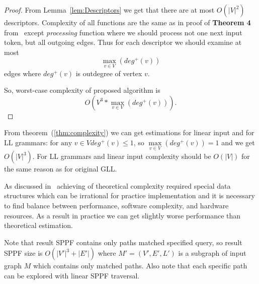 \begin{proof}

From Lemma~\ref{lem:Descriptors} we get that there are at most $O(|V|^2)$ descriptors. 
Complexity of all functions are the same as in proof of \textbf{Theorem 4} from~\cite{gllParsingTree} except \textit{processing} function where we should process not one next input token, but all outgoing edges.
Thus for each descriptor we should examine at most $$\max\limits_{v \in V}\left(deg^+\left(v\right)\right)$$ edges where $deg^+(v)$ is outdegree of vertex $v$.

So, worst-case complexity of proposed algorithm is $$O\left(V^3*\max\limits_{v \in V}\left(deg^+\left(v\right)\right)\right).$$
\end{proof}


From theorem~(\ref{thm:complexity}) we can get estimations for linear input and for LL grammars: $\text{for any } v \in V deg^+(v) \leq 1$, so $\max\limits_{v \in V}(deg^+(v))  = 1 $ and we get $O(|V|^3)$. 
For LL grammars and linear input complexity should be $O(|V|)$ for the same reason as for original GLL.
 

As discussed in~\cite{modellingGLL} achieving of theoretical complexity required special data structures which can be irrational for practice implementation and it is necessary to find balance between performance, software complexity, and hardware resources.
As a result in practice we can get slightly worse performance than theoretical estimation.

Note that result SPPF contains only paths matched specified query, so result SPPF size is $O(|V'|^3 + |E'|)$ where $M'=(V',E',L')$ is a subgraph of input graph $M$ which contains only matched paths.
Also note that each specific path can be explored with linear SPPF traversal. 
